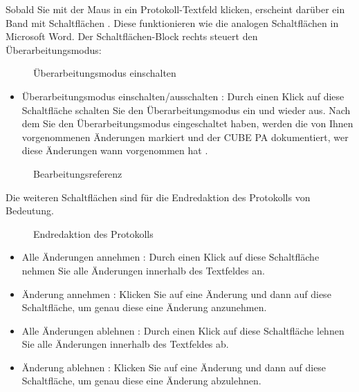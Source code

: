 Sobald Sie mit der Maus in ein Protokoll-Textfeld klicken, erscheint darüber ein Band mit Schaltflächen . Diese funktionieren wie die analogen Schaltflächen in Microsoft Word. Der Schaltflächen-Block rechts steuert den Überarbeitungsmodus:

\begin{figure}[H]
\caption{Überarbeitungsmodus einschalten}
\end{figure}

\begin{itemize}
\item
Überarbeitungsmodus einschalten/ausschalten : Durch einen Klick auf diese Schaltfläche schalten Sie den Überarbeitungsmodus ein und wieder aus. Nach dem Sie den Überarbeitungsmodus eingeschaltet haben, werden die von Ihnen vorgenommenen Änderungen markiert  und der CUBE PA dokumentiert, wer diese Änderungen wann vorgenommen hat .
\end{itemize}

\begin{figure}[H]
\caption{Bearbeitungsreferenz}
\end{figure}

Die weiteren Schaltflächen sind für die Endredaktion des Protokolls von Bedeutung.

\begin{figure}[H]
\caption{Endredaktion des Protokolls}
\end{figure}

\begin{itemize}
\item
Alle Änderungen annehmen : Durch einen Klick auf diese Schaltfläche nehmen Sie alle Änderungen innerhalb des Textfeldes an.
\item
Änderung annehmen : Klicken Sie auf eine Änderung und dann auf diese Schaltfläche, um genau diese eine Änderung anzunehmen.
\item
Alle Änderungen ablehnen : Durch einen Klick auf diese Schaltfläche lehnen Sie alle Änderungen innerhalb des Textfeldes ab.
\item
Änderung ablehnen : Klicken Sie auf eine Änderung und dann auf diese Schaltfläche, um genau diese eine Änderung abzulehnen.
\end{itemize}

